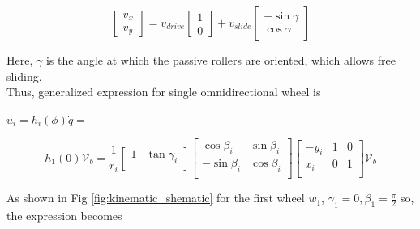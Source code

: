 \documentclass[12pt, twoside]{report}
\begin{document}
\begin{equation}
    \begin{bmatrix}
        v_x \\ v_y
    \end{bmatrix}
    =
    v_{drive} \begin{bmatrix}
        1 \\ 0
    \end{bmatrix}
    +
    v_{slide} \begin{bmatrix}
        -\sin{\gamma} \\ \cos{\gamma}
    \end{bmatrix}
\end{equation}

Here, $\gamma$ is the angle at which the passive rollers are oriented,
which allows free sliding. \\

Thus, generalized expression for single omnidirectional wheel is
\newline

$u_i  = h_i (\phi) \dot{q} =  $


\begin{equation}
    h_1(0) \mathcal{V}_b = \frac{1}{r_i} \left[\begin{array}{cc}
            1 & \tan\gamma_i \\
        \end{array}\right]
    \left[\begin{array}{cc}
            \cos \beta_i  & \sin \beta_i \\
            -\sin \beta_i & \cos \beta_i \\
        \end{array}\right]
    \begin{bmatrix}
        -y_i & 1 & 0 \\
        x_i  & 0 & 1 \\
    \end{bmatrix} \mathcal{V}_b
\end{equation}

As shown in Fig \ref{fig:kinematic_shematic} for the first
wheel $w_1$, $\gamma_1 = 0, \beta_1 = \frac{\pi}{2}$ so, the expression becomes
\end{document}
